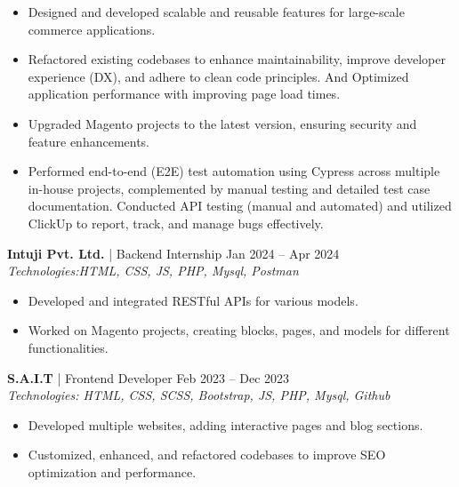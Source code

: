 \documentclass[a4paper,10pt]{article}
\begin{document}
\begin{itemize}
    \item Designed and developed scalable and reusable features for large-scale commerce applications.
    \item Refactored existing codebases to enhance maintainability, improve developer experience (DX), and adhere to clean code principles. And Optimized application performance with improving page load times.
    \item Upgraded Magento projects to the latest version, ensuring security and feature enhancements.
   \item Performed end-to-end (E2E) test automation using Cypress across multiple in-house projects, complemented by manual testing and detailed test case documentation. Conducted API testing (manual and automated) and utilized ClickUp to report, track, and manage bugs effectively.




\end{itemize}

\noindent\textbf{Intuji Pvt. Ltd.} | Backend Internship \hfill Jan 2024 -- Apr 2024 \\
\textit{Technologies:HTML, CSS, JS, PHP, Mysql, Postman }

\begin{itemize}
    \item Developed and integrated RESTful APIs for various models. 
    \item Worked on Magento projects, creating blocks, pages, and models for different functionalities.
\end{itemize}

\noindent\textbf{S.A.I.T} | Frontend Developer \hfill Feb 2023 -- Dec 2023 \\
\textit{Technologies: HTML, CSS, SCSS, Bootstrap, JS, PHP, Mysql, Github}

\begin{itemize}
    \item Developed multiple websites, adding interactive pages and blog sections.
    \item  Customized, enhanced, and refactored codebases to improve SEO optimization and performance.

\end{itemize}

\end{document}
